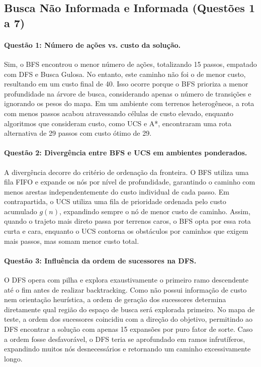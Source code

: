 \documentclass[12pt]{article}
\begin{document}
\subsection{Busca Não Informada e Informada (Questões 1 a 7)}

\paragraph{Questão 1: Número de ações vs. custo da solução.}
Sim, o BFS encontrou o menor número de ações, totalizando 15 passos, empatado com DFS e Busca Gulosa. No entanto, este caminho não foi o de menor custo, resultando em um custo final de 40. Isso ocorre porque o BFS prioriza a menor profundidade na árvore de busca, considerando apenas o número de transições e ignorando os pesos do mapa. Em um ambiente com terrenos heterogêneos, a rota com menos passos acabou atravessando células de custo elevado, enquanto algoritmos que consideram custo, como UCS e A*, encontraram uma rota alternativa de 29 passos com custo ótimo de 29.

\paragraph{Questão 2: Divergência entre BFS e UCS em ambientes ponderados.}
A divergência decorre do critério de ordenação da fronteira. O BFS utiliza uma fila FIFO e expande os nós por nível de profundidade, garantindo o caminho com menos arestas independentemente do custo individual de cada passo. Em contrapartida, o UCS utiliza uma fila de prioridade ordenada pelo custo acumulado $g(n)$, expandindo sempre o nó de menor custo de caminho. Assim, quando o trajeto mais direto passa por terrenos caros, o BFS opta por essa rota curta e cara, enquanto o UCS contorna os obstáculos por caminhos que exigem mais passos, mas somam menor custo total.

\paragraph{Questão 3: Influência da ordem de sucessores na DFS.}
O DFS opera com pilha e explora exaustivamente o primeiro ramo descendente até o fim antes de realizar backtracking. Como não possui informação de custo nem orientação heurística, a ordem de geração dos sucessores determina diretamente qual região do espaço de busca será explorada primeiro. No mapa de teste, a ordem dos sucessores coincidiu com a direção do objetivo, permitindo ao DFS encontrar a solução com apenas 15 expansões por puro fator de sorte. Caso a ordem fosse desfavorável, o DFS teria se aprofundado em ramos infrutíferos, expandindo muitos nós desnecessários e retornando um caminho excessivamente longo.
\end{document}
